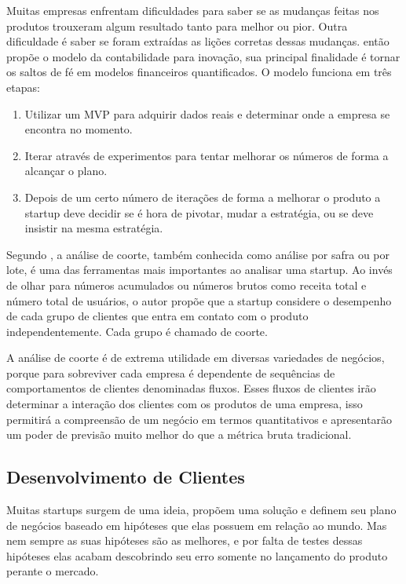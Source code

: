 Muitas empresas enfrentam dificuldades para saber se as mudanças feitas nos produtos trouxeram algum resultado tanto para melhor ou pior. Outra dificuldade é saber se foram extraídas as lições corretas dessas mudanças.  então propõe o modelo da contabilidade para inovação, sua principal finalidade é tornar os saltos de fé em modelos financeiros quantificados. O modelo funciona em três etapas:
\begin{enumerate}
\item Utilizar um MVP para adquirir dados reais e determinar onde a empresa se encontra no momento.
\item Iterar através de experimentos para tentar melhorar os números de forma a alcançar o plano.
\item Depois de um certo número de iterações de forma a melhorar o produto a startup deve decidir se é hora de pivotar, mudar a estratégia, ou se deve insistir na mesma estratégia.
\end{enumerate}

Segundo , a análise de coorte, também conhecida como análise por safra ou por lote, é uma das ferramentas mais importantes ao analisar uma startup. Ao invés de olhar para números acumulados ou números brutos como receita total e número total de usuários, o autor propõe que a startup considere o desempenho de cada grupo de clientes que entra em contato com o produto independentemente. Cada grupo é chamado de coorte.

A análise de coorte é de extrema utilidade em diversas variedades de negócios, porque para sobreviver cada empresa é dependente de sequências de comportamentos de clientes denominadas fluxos. Esses fluxos de clientes irão determinar a interação dos clientes com os produtos de uma empresa, isso permitirá a compreensão de um negócio em termos quantitativos e apresentarão um poder de previsão muito melhor do que a métrica bruta tradicional. \cite{leanstartup}

\subsection{Desenvolvimento de Clientes}
\label{cha:desenvolvimento_de_clientes}
Muitas startups surgem de uma ideia, propõem uma solução e definem seu plano de negócios baseado em hipóteses que elas possuem em relação ao mundo. Mas nem sempre as suas hipóteses são as melhores, e por falta de testes dessas hipóteses elas acabam descobrindo seu erro somente no lançamento do produto perante o mercado.

